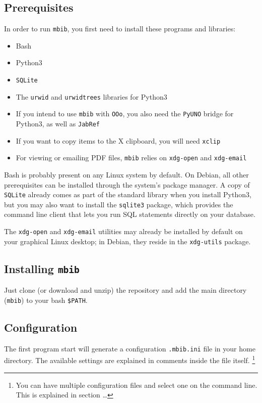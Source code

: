 \documentclass[10pt]{article}
\newcommand*{\mbib}{\texttt{mbib}\xspace}
\newcommand*{\jabref}{\texttt{JabRef}\xspace}
\newcommand*{\ooo}{\texttt{OOo}\xspace}
\newcommand*{\sqlite}{\texttt{SQLite}\xspace}
\newcommand*{\ini}{\texttt{.mbib.ini}\xspace}
\begin{document}
\subsection{Prerequisites}

In order to run \mbib, you first need to install these programs and libraries:

\begin{itemize}
\item Bash
\item Python3 
\item \sqlite
\item The \texttt{urwid} and \texttt{urwidtrees} libraries for Python3
\item If you intend to use \mbib with \ooo, you also need the \texttt{PyUNO} bridge for Python3, as well as \jabref
\item If you want to copy items to the X clipboard, you will need \texttt{xclip}
\item For viewing or emailing PDF files, \mbib relies on \texttt{xdg-open} and \texttt{xdg-email}
\end{itemize}

\noindent Bash is probably present on any Linux system by default. On Debian, all other prerequisites can be installed through the system's package manager. A copy of \sqlite already comes as part of the standard library when you install Python3, but you may also want to install the \texttt{sqlite3} package, which provides the command line client that lets you run SQL statements directly on your database. 

The \texttt{xdg-open} and \texttt{xdg-email} utilities may already be installed by default on your graphical Linux desktop; in Debian, they reside in the \texttt{xdg-utils} package.

\subsection{Installing \mbib}

Just clone (or download and unzip) the repository and add the main directory (\mbib) to your bash \texttt{\$PATH}. 

\subsection{Configuration}

The first program start will generate a configuration \ini file in your home directory. The available settings are explained in comments inside the file itself.%
%
\footnote{You can have multiple configuration files and select one on the command line. This is explained in section \dots}
\end{document}
